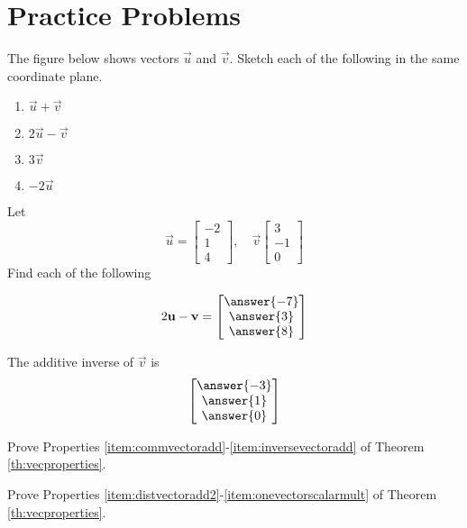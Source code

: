 \documentclass{ximera}
\begin{document}
\section*{Practice Problems}
 
 \begin{problem}
The figure below shows vectors $\vec{u}$ and $\vec{v}$.  Sketch each of the following in the same coordinate plane.
 
\begin{image}[2.5in]
\end{image}
 \begin{enumerate}
  \item 
  $\vec{u}+\vec{v}$
  \item
  $2\vec{u}-\vec{v}$
  \item 
  $3\vec{v}$
  \item
  $-2\vec{u}$
  \end{enumerate}
\end{problem}

\begin{problem} Let $$\vec{u}=\begin{bmatrix}-2\\1\\4\end{bmatrix},\quad\vec{v}\begin{bmatrix}3\\-1\\0\end{bmatrix}$$
Find each of the following
\begin{problem}
$$2\vec{u}-\vec{v}=\begin{bmatrix}\answer{-7}\\\answer{3}\\\answer{8}\end{bmatrix}$$
\end{problem}
\begin{problem} The additive inverse of $\vec{v}$ is
$$\begin{bmatrix}\answer{-3}\\\answer{1}\\\answer{0}\end{bmatrix}$$
\end{problem}
\end{problem}

\begin{problem}
Prove Properties \ref{item:commvectoradd}-\ref{item:inversevectoradd} of Theorem \ref{th:vecproperties}.
\end{problem}

\begin{problem}
Prove Properties \ref{item:distvectoradd2}-\ref{item:onevectorscalarmult} of Theorem \ref{th:vecproperties}.
\end{problem}
 
\end{document}

